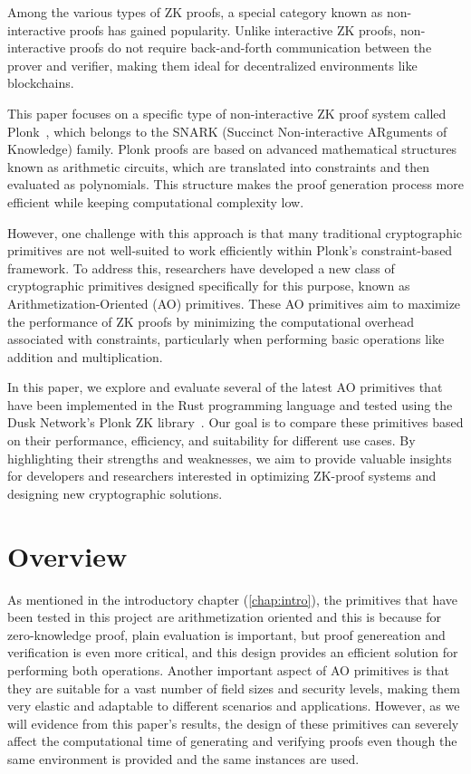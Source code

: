 \documentclass[12pt, a4paper]{report}
\begin{document}
Among the various types of ZK proofs, a special category known as non-interactive proofs has gained popularity. Unlike interactive ZK proofs, non-interactive proofs do not require back-and-forth communication between the prover and verifier, making them ideal for decentralized environments like blockchains.

This paper focuses on a specific type of non-interactive ZK proof system called \textsf{Plonk}~\cite{plonk}, which belongs to the SNARK (Succinct Non-interactive ARguments of Knowledge) family. \textsf{Plonk} proofs are based on advanced mathematical structures known as arithmetic circuits, which are translated into constraints and then evaluated as polynomials. This structure makes the proof generation process more efficient while keeping computational complexity low.

However, one challenge with this approach is that many traditional cryptographic primitives are not well-suited to work efficiently within \textsf{Plonk}'s constraint-based framework. To address this, researchers have developed a new class of cryptographic primitives designed specifically for this purpose, known as Arithmetization-Oriented (AO) primitives. These AO primitives aim to maximize the performance of ZK proofs by minimizing the computational overhead associated with constraints, particularly when performing basic operations like addition and multiplication.

In this paper, we explore and evaluate several of the latest AO primitives that have been implemented in the Rust programming language and tested using the Dusk Network's \textsf{Plonk} ZK library~\cite{dusk-plonk}. Our goal is to compare these primitives based on their performance, efficiency, and suitability for different use cases. By highlighting their strengths and weaknesses, we aim to provide valuable insights for developers and researchers interested in optimizing ZK-proof systems and designing new cryptographic solutions.

\chapter{Overview}\label{chap:overview}

As mentioned in the introductory chapter (\ref{chap:intro}), the primitives that have been tested in this project are arithmetization oriented and this is because for zero-knowledge proof, plain evaluation is important, but proof genereation and verification is even more critical, and this design provides an efficient solution for performing both operations.
Another important aspect of AO primitives is that they are suitable for a vast number of field sizes and security levels, making them very elastic and adaptable to different scenarios and applications.
However, as we will evidence from this paper's results, the design of these primitives can severely affect the computational time of generating and verifying proofs even though the same environment is provided and the same instances are used.
\end{document}
